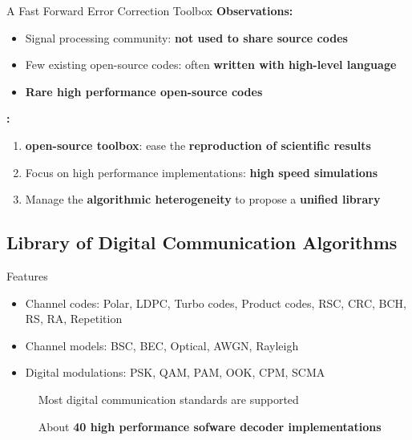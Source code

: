\begin{frame}{A Fast Forward Error Correction Toolbox}
  \vfill
  \textbf{Observations:}

  \vspace{0.1cm}
  \begin{itemize}
    \item Signal processing community: \textbf{not used to share source codes}
    \item Few existing open-source codes: often \textbf{written with high-level language}
    \item \textbf{Rare high performance open-source codes}
  \end{itemize}

  \vfill
  \pause
  \textbf{\AFFECT:}

  \vspace{0.1cm}
  \begin{enumerate}
    \item \Cxx \textbf{open-source toolbox}: ease the \textbf{reproduction of scientific results}
    \pause
    \item Focus on high performance implementations: \textbf{high speed simulations}
    \pause
    \item Manage the \textbf{algorithmic heterogeneity} to propose a \textbf{unified library}
  \end{enumerate}
  \vfill
\end{frame}

\subsection[Library]{Library of Digital Communication Algorithms}

\begin{frame}{Features}
  \vfill
  \begin{itemize}
    \item Channel codes: Polar, LDPC, Turbo codes, Product codes, RSC, CRC, BCH, RS, RA, Repetition
    \vspace{0.1cm}
    \item Channel models: BSC, BEC, Optical, AWGN, Rayleigh
    \vspace{0.1cm}
    \item Digital modulations: PSK, QAM, PAM, OOK, CPM, SCMA
  \end{itemize}
  \vfill
  \pause

  \vspace*{.5em}
  ~~~~~{\color{bleuUni}\Large\MVRightarrow} Most digital communication standards are supported

  \vspace*{.5em}
  ~~~~~{\color{bleuUni}\Large\MVRightarrow} About \textbf{40 high performance sofware decoder implementations}
  \vfill
\end{frame}

